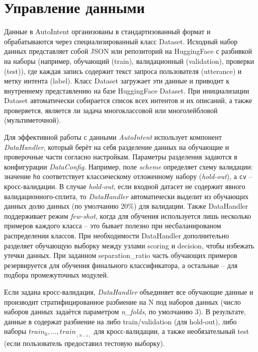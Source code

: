 \documentclass[14pt,a4paper,oneside,openany]{extbook}
\begin{document}
\section{Управление данными}
\label{sec:org98ea497}
Данные в AutoIntent организованы в стандартизованный формат и обрабатываются через специализированный класс Dataset. Исходный набор данных представляет собой JSON или репозиторий на HuggingFace с разбивкой на наборы (например, обучающий (train), валидационный (validation), проверки (test)), где каждая запись содержит текст запроса пользователя (utterance) и метку интента (label). Класс Dataset загружает эти данные и приводит к внутреннему представлению на базе HuggingFace Dataset. При инициализации Dataset автоматически собирается список всех интентов и их описаний, а также проверяется, является ли задача многоклассовой или многолейбловой (мультиметочной).

Для эффективной работы с данными \emph{AutoIntent} использует компонент \emph{DataHandler}, который берёт на себя разделение данных на обучающие и проверочные части согласно настройкам. Параметры разделения задаются в конфигурации \emph{DataConfig}. Например, поле \emph{scheme} определяет схему валидации: значение \texttt{ho} соответствует классическому отложенному набору (\emph{hold-out}), а \texttt{cv} – кросс-валидации. В случае \emph{hold-out}, если входной датасет не содержит явного валидационного-сплита, то \emph{DataHandler} автоматически выделит из обучающих данных долю данных (по умолчанию 20\%) для валидации. Также DataHandler поддерживает режим \emph{few-shot}, когда для обучения используется лишь несколько примеров каждого класса – это бывает полезно при несбаланированом распределении классов. При необходимости DataHandler дополнительно разделяет обучающую выборку между узлами scoring и decision, чтобы избежать утечки данных. При заданном separation\_ratio часть обучающих примеров резервируется для обучения финального классификатора, а остальные – для подбора промежуточных модулей.

Если задана кросс-валидация, \emph{DataHandler} объединяет все обучающие данные и производит стратифицированное разбиение на N под наборов данных (число наборов данных задаётся параметром \emph{n\_folds}, по умолчанию 3). В результате, данные в содержат разбиение на либо train/validation (для hold-out), либо наборы \(train_0, \dots, train_{_(N-1)}\) для кросс-валидации, а также необязательный test (если пользователь предоставил тестовую выборку).
\end{document}
